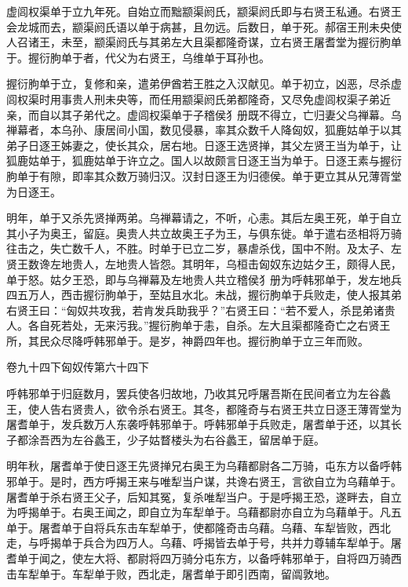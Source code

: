 \documentclass[12pt,UTF8]{ctexbook}
\begin{document}
虚闾权渠单于立九年死。自始立而黜颛渠阏氏，颛渠阏氏即与右贤王私通。右贤王会龙城而去，颛渠阏氏语以单于病甚，且勿远。后数日，单于死。郝宿王刑未央使人召诸王，未至，颛渠阏氏与其弟左大且渠都隆奇谋，立右贤王屠耆堂为握衍朐单于。握衍朐单于者，代父为右贤王，乌维单于耳孙也。



握衍朐单于立，复修和亲，遣弟伊酋若王胜之入汉献见。单于初立，凶恶，尽杀虚闾权渠时用事贵人刑未央等，而任用颛渠阏氏弟都隆奇，又尽免虚闾权渠子弟近亲，而自以其子弟代之。虚闾权渠单于子稽侯犭册既不得立，亡归妻父乌禅幕。乌禅幕者，本乌孙、康居间小国，数见侵暴，率其众数千人降匈奴，狐鹿姑单于以其弟子日逐王姊妻之，使长其众，居右地。日逐王选贤掸，其父左贤王当为单于，让狐鹿姑单于，狐鹿姑单于许立之。国人以故颇言日逐王当为单于。日逐王素与握衍朐单于有隙，即率其众数万骑归汉。汉封日逐王为归德侯。单于更立其从兄薄胥堂为日逐王。



明年，单于又杀先贤掸两弟。乌禅幕请之，不听，心恚。其后左奥王死，单于自立其小子为奥王，留庭。奥贵人共立故奥王子为王，与俱东徙。单于遣右丞相将万骑往击之，失亡数千人，不胜。时单于已立二岁，暴虐杀伐，国中不附。及太子、左贤王数谗左地贵人，左地贵人皆怨。其明年，乌桓击匈奴东边姑夕王，颇得人民，单于怒。姑夕王恐，即与乌禅幕及左地贵人共立稽侯犭册为呼韩邪单于，发左地兵四五万人，西击握衍朐单于，至姑且水北。未战，握衍朐单于兵败走，使人报其弟右贤王曰：“匈奴共攻我，若肯发兵助我乎？”右贤王曰：“若不爱人，杀昆弟诸贵人。各自死若处，无来污我。”握衍朐单于恚，自杀。左大且渠都隆奇亡之右贤王所，其民众尽降呼韩邪单于。是岁，神爵四年也。握衍朐单于立三年而败。





卷九十四下匈奴传第六十四下



呼韩邪单于归庭数月，罢兵使各归故地，乃收其兄呼屠吾斯在民间者立为左谷蠡王，使人告右贤贵人，欲令杀右贤王。其冬，都隆奇与右贤王共立日逐王薄胥堂为屠耆单于，发兵数万人东袭呼韩邪单于。呼韩邪单于兵败走，屠耆单于还，以其长子都涂吾西为左谷蠡王，少子姑瞀楼头为右谷蠡王，留居单于庭。



明年秋，屠耆单于使日逐王先贤掸兄右奥王为乌藉都尉各二万骑，屯东方以备呼韩邪单于。是时，西方呼揭王来与唯犁当户谋，共谗右贤王，言欲自立为乌藉单于。屠耆单于杀右贤王父子，后知其冤，复杀唯犁当户。于是呼揭王恐，遂畔去，自立为呼揭单于。右奥王闻之，即自立为车犁单于。乌藉都尉亦自立为乌藉单于。凡五单于。屠耆单于自将兵东击车犁单于，使都隆奇击乌藉。乌藉、车犁皆败，西北走，与呼揭单于兵合为四万人。乌藉、呼揭皆去单于号，共并力尊辅车犁单于。屠耆单于闻之，使左大将、都尉将四万骑分屯东方，以备呼韩邪单于，自将四万骑西击车犁单于。车犁单于败，西北走，屠耆单于即引西南，留阘敦地。
\end{document}
